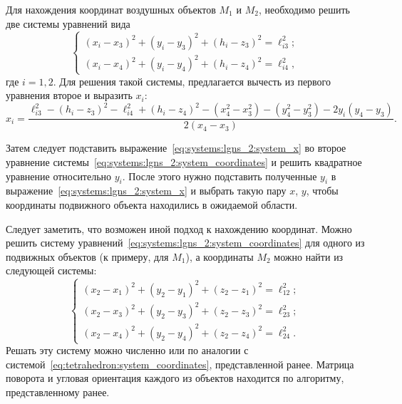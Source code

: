 \documentclass[../main.tex]{subfiles}
\begin{document}
Для нахождения координат воздушных объектов $M_1$ и $M_2$, необходимо решить две системы уравнений вида
\begin{equation}\label{eq:systems:lgns_2:system_coordinates}
  \begin{cases}
    \left(x_i - x_3\right)^2 + \left(y_i - y_3\right)^2 + \left(h_i - z_3\right)^2 = \ell_{i3}^2; \\
    \left(x_i - x_4\right)^2 + \left(y_i - y_4\right)^2 + \left(h_i - z_4\right)^2 = \ell_{i4}^2,
  \end{cases}
\end{equation}
где $i = 1,2$. Для решения такой системы, предлагается вычесть из первого уравнения второе и выразить $x_i$:
\begin{equation}\label{eq:systems:lgns_2:system_x}
  x_i = \frac{\ell_{i3}^2 - \left(h_i - z_3\right)^2 - \ell_{i4}^2 + \left(h_i - z_4\right)^2 - \left(x_4^2 - x_3^2\right) - \left(y_4^2 - y_3^2\right) - 2 y_i \left(y_4 - y_3\right)}{2\left(x_4 - x_3\right)}.
\end{equation}

Затем следует подставить выражение~\eqref{eq:systems:lgns_2:system_x} во второе уравнение системы~\eqref{eq:systems:lgns_2:system_coordinates} и решить квадратное уравнение относительно $y_i$. После этого нужно подставить  полученные $y_i$ в выражение~\eqref{eq:systems:lgns_2:system_x} и выбрать такую пару $x$, $y$, чтобы координаты подвижного объекта находились в ожидаемой области.

Следует заметить, что возможен иной подход к нахождению координат. Можно решить систему уравнений~\eqref{eq:systems:lgns_2:system_coordinates} для одного из подвижных объектов (к примеру, для $M_1$), а координаты $M_2$ можно найти из следующей системы:
\begin{equation*}
  \begin{cases}
    \left(x_2 - x_1\right)^2 + \left(y_2 - y_1\right)^2 + \left(z_2 - z_1\right)^2 = \ell_{12}^2; \\
    \left(x_2 - x_3\right)^2 + \left(y_2 - y_3\right)^2 + \left(z_2 - z_3\right)^2 = \ell_{23}^2; \\
    \left(x_2 - x_4\right)^2 + \left(y_2 - y_4\right)^2 + \left(z_2 - z_4\right)^2 = \ell_{24}^2.
  \end{cases}
\end{equation*}
Решать эту систему можно численно или по аналогии с системой~\eqref{eq:tetrahedron:system_coordinates}, представленной ранее. Матрица поворота и угловая ориентация каждого из объектов находится по алгоритму, представленному ранее.
\end{document}
